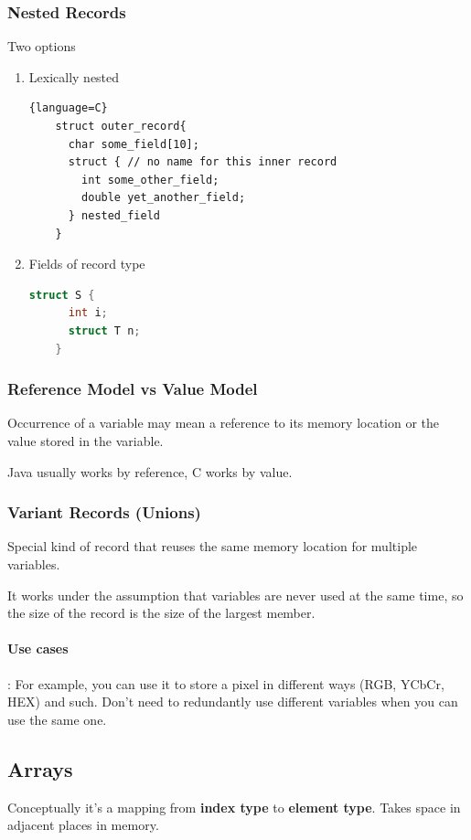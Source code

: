 \documentclass{article}
\begin{document}
\subsubsection{Nested Records}
Two options
\begin{enumerate}
  \item Lexically nested
  \begin{lstlisting}{language=C}
    struct outer_record{
      char some_field[10];
      struct { // no name for this inner record
        int some_other_field;
        double yet_another_field;
      } nested_field
    }
  \end{lstlisting}
  \item Fields of record type
  \begin{lstlisting}[language=C]
    struct S {
      int i;
      struct T n;
    }
  \end{lstlisting}
\end{enumerate}

\subsubsection{Reference Model vs Value Model}
Occurrence of a variable may mean a reference to its memory location or the value stored in the variable.

Java usually works by reference, C works by value.
\subsubsection{Variant Records (Unions)}
Special kind of record that reuses the same memory location for multiple variables.

It works under the assumption that variables are never used at the same time, so the size of the record is the size of the largest member.

\paragraph{Use cases}: For example, you can use it to store a pixel in different ways (RGB, YCbCr, HEX) and such. Don't need to redundantly use different variables when you can use the same one.

\subsection{Arrays}
Conceptually it's a mapping from \textbf{index type} to \textbf{element type}. Takes space in adjacent places in memory.
\end{document}
